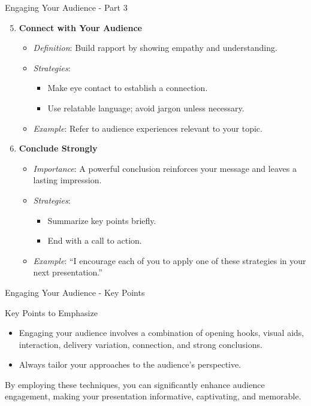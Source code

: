 \documentclass[aspectratio=169]{beamer}
\begin{document}
\begin{frame}[fragile]{Engaging Your Audience - Part 3}
    \begin{enumerate}
        \setcounter{enumi}{4}
        \item \textbf{Connect with Your Audience}
        \begin{itemize}
            \item \textit{Definition}: Build rapport by showing empathy and understanding.
            \item \textit{Strategies}:
            \begin{itemize}
                \item Make eye contact to establish a connection.
                \item Use relatable language; avoid jargon unless necessary.
            \end{itemize}
            \item \textit{Example}: Refer to audience experiences relevant to your topic.
        \end{itemize}

        \item \textbf{Conclude Strongly}
        \begin{itemize}
            \item \textit{Importance}: A powerful conclusion reinforces your message and leaves a lasting impression.
            \item \textit{Strategies}:
            \begin{itemize}
                \item Summarize key points briefly.
                \item End with a call to action.
            \end{itemize}
            \item \textit{Example}: “I encourage each of you to apply one of these strategies in your next presentation.”
        \end{itemize}
    \end{enumerate}
\end{frame}

\begin{frame}[fragile]{Engaging Your Audience - Key Points}
    \begin{block}{Key Points to Emphasize}
        \begin{itemize}
            \item Engaging your audience involves a combination of opening hooks, visual aids, interaction, delivery variation, connection, and strong conclusions.
            \item Always tailor your approaches to the audience's perspective.
        \end{itemize}
    \end{block}
    
    By employing these techniques, you can significantly enhance audience engagement, making your presentation informative, captivating, and memorable.
\end{frame}
\end{document}
